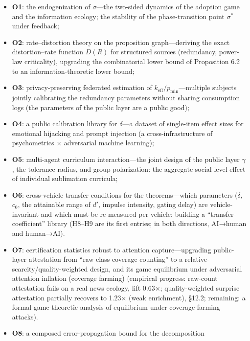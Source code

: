 \documentclass[
  11pt]{article}
\providecommand{\tightlist}{%
  \setlength{\itemsep}{0pt}\setlength{\parskip}{0pt}}
\begin{document}
\begin{itemize}
\tightlist
\item
  \textbf{O1}: the endogenization of \(\sigma\)---the two-sided dynamics
  of the adoption game and the information ecology; the stability of the
  phase-transition point \(\sigma^*\) under feedback;
\item
  \textbf{O2}: rate--distortion theory on the proposition
  graph---deriving the exact distortion--rate function \(D(R)\) for
  structured sources (redundancy, power-law criticality), upgrading the
  combinatorial lower bound of Proposition 6.2 to an
  information-theoretic lower bound;
\item
  \textbf{O3}: privacy-preserving federated estimation of
  \(k_{\mathrm{eff}}/p_{\min}\)---multiple subjects jointly calibrating
  the redundancy parameters without sharing consumption logs (the
  parameters of the public layer are a public good);
\item
  \textbf{O4}: a public calibration library for \(\delta\)---a dataset
  of single-item effect sizes for emotional hijacking and prompt
  injection (a cross-infrastructure of psychometrics × adversarial
  machine learning);
\item
  \textbf{O5}: multi-agent curriculum interaction---the joint design of
  the public layer \(\gamma\), the tolerance radius, and group
  polarization: the aggregate social-level effect of individual
  sublimation curricula;
\item
  \textbf{O6}: cross-vehicle transfer conditions for the
  theorems---which parameters (\(\delta\), \(c_0\), the attainable range
  of \(d'\), impulse intensity, gating delay) are vehicle-invariant and
  which must be re-measured per vehicle: building a
  ``transfer-coefficient'' library (H8--H9 are its first entries; in
  both directions, AI→human and human→AI).
\item
  \textbf{O7}: certification statistics robust to attention
  capture---upgrading public-layer attestation from ``raw class-coverage
  counting'' to a relative-scarcity/quality-weighted design, and its
  game equilibrium under adversarial attention inflation (coverage
  farming) (empirical progress: raw-count attestation fails on a real
  news ecology, lift 0.63×; quality-weighted surprise attestation
  partially recovers to 1.23× (weak enrichment), §12.2; remaining: a
  formal game-theoretic analysis of equilibrium under coverage-farming
  attacks).
\item
  \textbf{O8}: a composed error-propagation bound for the decomposition

\end{itemize}
\end{document}
